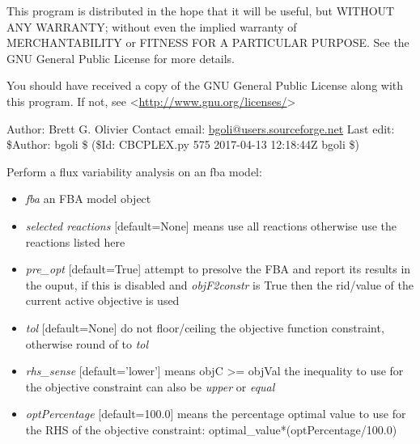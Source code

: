\documentclass[a4paper,11pt,english]{sphinxmanual}
\begin{document}
This program is distributed in the hope that it will be useful,
but WITHOUT ANY WARRANTY; without even the implied warranty of
MERCHANTABILITY or FITNESS FOR A PARTICULAR PURPOSE.  See the
GNU General Public License for more details.

You should have received a copy of the GNU General Public License
along with this program.  If not, see \textless{}\url{http://www.gnu.org/licenses/}\textgreater{}

Author: Brett G. Olivier
Contact email: \href{mailto:bgoli@users.sourceforge.net}{bgoli@users.sourceforge.net}
Last edit: \$Author: bgoli \$ (\$Id: CBCPLEX.py 575 2017-04-13 12:18:44Z bgoli \$)

\begin{fulllineitems}
\label{modules_doc:cbmpy.CBCPLEX.cplx_FluxVariabilityAnalysis}
Perform a flux variability analysis on an fba model:
\begin{itemize}
\item {} 
\emph{fba} an FBA model object

\item {} 
\emph{selected reactions} {[}default=None{]} means use all reactions otherwise use the reactions listed here

\item {} 
\emph{pre\_opt} {[}default=True{]} attempt to presolve the FBA and report its results in the ouput, if this is disabled and \emph{objF2constr} is True then the rid/value of the current active objective is used

\item {} 
\emph{tol}  {[}default=None{]} do not floor/ceiling the objective function constraint, otherwise round of to \emph{tol}

\item {} 
\emph{rhs\_sense} {[}default='lower'{]} means objC \textgreater{}= objVal the inequality to use for the objective constraint can also be \emph{upper} or \emph{equal}

\item {} 
\emph{optPercentage} {[}default=100.0{]} means the percentage optimal value to use for the RHS of the objective constraint: optimal\_value*(optPercentage/100.0)


\end{itemize}
\end{fulllineitems}
\end{document}
